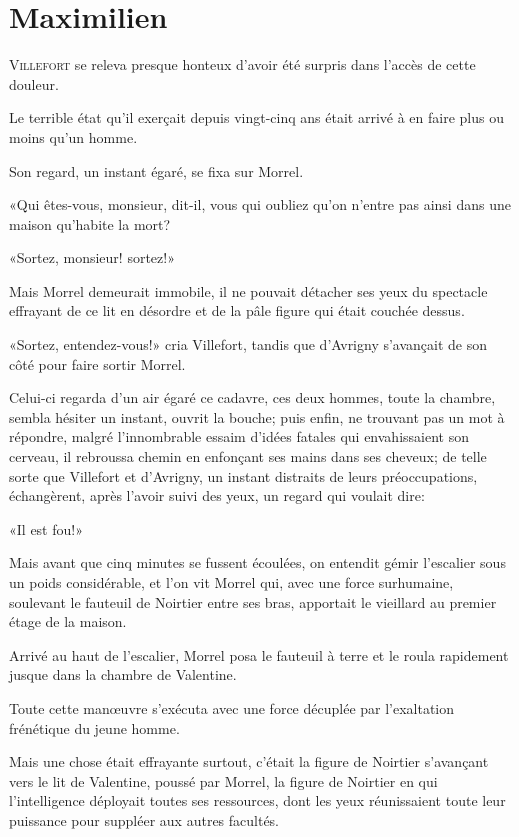 \chapter{Maximilien}

\lettrine{V}{illefort} se releva presque honteux d'avoir été surpris dans l'accès de cette douleur. 

\zz
Le terrible état qu'il exerçait depuis vingt-cinq ans était arrivé à en faire plus ou moins qu'un homme. 

Son regard, un instant égaré, se fixa sur Morrel. 

«Qui êtes-vous, monsieur, dit-il, vous qui oubliez qu'on n'entre pas ainsi dans une maison qu'habite la mort? 

«Sortez, monsieur! sortez!» 

Mais Morrel demeurait immobile, il ne pouvait détacher ses yeux du spectacle effrayant de ce lit en désordre et de la pâle figure qui était couchée dessus. 

«Sortez, entendez-vous!» cria Villefort, tandis que d'Avrigny s'avançait de son côté pour faire sortir Morrel. 

Celui-ci regarda d'un air égaré ce cadavre, ces deux hommes, toute la chambre, sembla hésiter un instant, ouvrit la bouche; puis enfin, ne trouvant pas un mot à répondre, malgré l'innombrable essaim d'idées fatales qui envahissaient son cerveau, il rebroussa chemin en enfonçant ses mains dans ses cheveux; de telle sorte que Villefort et d'Avrigny, un instant distraits de leurs préoccupations, échangèrent, après l'avoir suivi des yeux, un regard qui voulait dire: 

«Il est fou!» 

Mais avant que cinq minutes se fussent écoulées, on entendit gémir l'escalier sous un poids considérable, et l'on vit Morrel qui, avec une force surhumaine, soulevant le fauteuil de Noirtier entre ses bras, apportait le vieillard au premier étage de la maison. 

Arrivé au haut de l'escalier, Morrel posa le fauteuil à terre et le roula rapidement jusque dans la chambre de Valentine. 

Toute cette manœuvre s'exécuta avec une force décuplée par l'exaltation frénétique du jeune homme. 

Mais une chose était effrayante surtout, c'était la figure de Noirtier s'avançant vers le lit de Valentine, poussé par Morrel, la figure de Noirtier en qui l'intelligence déployait toutes ses ressources, dont les yeux réunissaient toute leur puissance pour suppléer aux autres facultés. 

